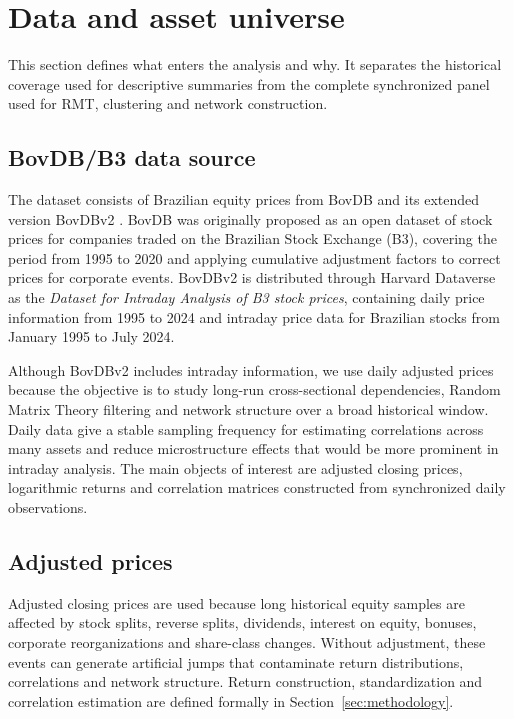 \section{Data and asset universe}
\label{sec:data}

This section defines what enters the analysis and why. It separates the historical coverage used for descriptive summaries from the complete synchronized panel used for RMT, clustering and network construction.

\subsection{BovDB/B3 data source}

The dataset consists of Brazilian equity prices from BovDB and its extended version BovDBv2 \cite{cardoso_2022_bovdb,souza_2024_bovdbv2}. BovDB was originally proposed as an open dataset of stock prices for companies traded on the Brazilian Stock Exchange (B3), covering the period from 1995 to 2020 and applying cumulative adjustment factors to correct prices for corporate events. BovDBv2 is distributed through Harvard Dataverse as the \emph{Dataset for Intraday Analysis of B3 stock prices}, containing daily price information from 1995 to 2024 and intraday price data for Brazilian stocks from January 1995 to July 2024.

Although BovDBv2 includes intraday information, we use daily adjusted prices because the objective is to study long-run cross-sectional dependencies, Random Matrix Theory filtering and network structure over a broad historical window. Daily data give a stable sampling frequency for estimating correlations across many assets and reduce microstructure effects that would be more prominent in intraday analysis. The main objects of interest are adjusted closing prices, logarithmic returns and correlation matrices constructed from synchronized daily observations.

\subsection{Adjusted prices}

Adjusted closing prices are used because long historical equity samples are affected by stock splits, reverse splits, dividends, interest on equity, bonuses, corporate reorganizations and share-class changes. Without adjustment, these events can generate artificial jumps that contaminate return distributions, correlations and network structure. Return construction, standardization and correlation estimation are defined formally in Section~\ref{sec:methodology}.

